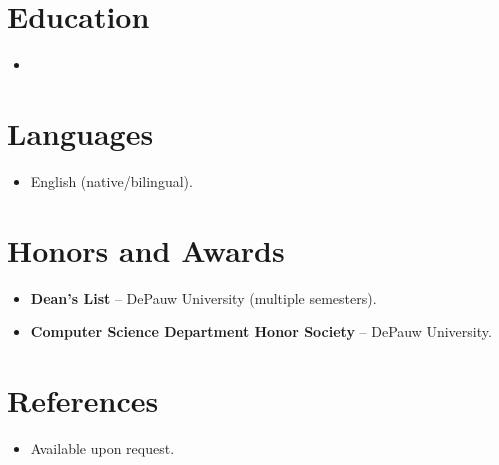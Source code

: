 \documentclass[11pt,a4paper,sans]{moderncv}
\begin{document}
\section{Education}
\vspace{1pt}
\begin{itemize}

\item{}

\end{itemize}


\section{Languages}
\vspace{1pt}
\begin{itemize}
\item English (native/bilingual).
\end{itemize}


\section{Honors and Awards}
\vspace{1pt}
\begin{itemize}
\item{\textbf{Dean's List} -- DePauw University (multiple semesters).}
\item{\textbf{Computer Science Department Honor Society} -- DePauw University.}
\end{itemize}


\section{References}
\vspace{1pt}
\begin{itemize}
\item{Available upon request.}
\end{itemize}
\end{document}
